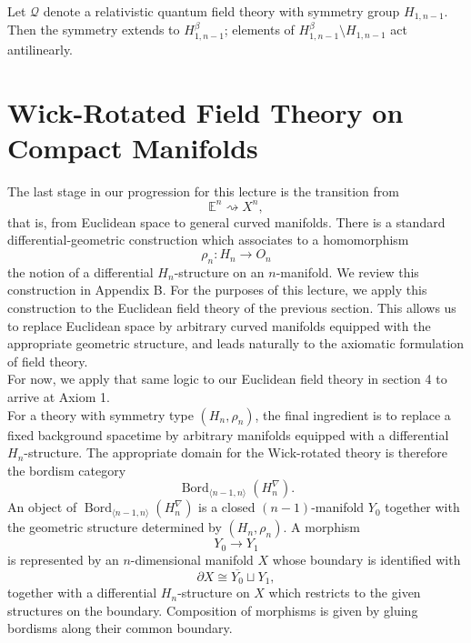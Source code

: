 \documentclass[a4paper,11pt]{article}
\begin{document}
\begin{theorem}
    Let $\mathcal{Q}$ denote a relativistic quantum field theory with symmetry group
    $H_{1,n-1}$. Then the symmetry extends to $H^{\beta}_{1,n-1}$; elements of
    $H^{\beta}_{1,n-1}\setminus H_{1,n-1}$ act antilinearly.
\end{theorem}



\section{Wick-Rotated Field Theory on Compact Manifolds}

The last stage in our progression for this lecture is the transition from
\[
\mathbb{E}^n \rightsquigarrow X^n,
\]
that is, from Euclidean space to general curved manifolds. There is a standard differential-geometric construction which associates to a homomorphism
\[
\rho_n:H_n\longrightarrow O_n
\]
the notion of a differential $H_n$-structure on an $n$-manifold. We review this construction in Appendix B. For the purposes of this lecture, we apply this construction to the Euclidean field theory of the previous section. This allows us to
replace Euclidean space by arbitrary curved manifolds equipped with the appropriate geometric structure, and leads naturally to the axiomatic formulation of field theory.\\


For now, we apply that same logic to our Euclidean field theory in section 4 to arrive at Axiom 1.\\

For a theory with symmetry type $(H_n,\rho_n)$, the final ingredient is to replace a fixed background spacetime by arbitrary manifolds equipped with a differential $H_n$-structure. The appropriate domain for the
Wick-rotated theory is therefore the bordism category
\[
\operatorname{Bord}_{\langle n-1,n\rangle}(H_n^\nabla).
\]
An object of $\operatorname{Bord}_{\langle n-1,n \rangle}(H_n^\nabla)$ is a closed $(n-1)$-manifold $Y_0$ together with the geometric structure determined by
$(H_n,\rho_n)$. A morphism
\[
Y_0 \longrightarrow Y_1
\]
is represented by an $n$-dimensional manifold $X$ whose boundary is
identified with
\[
\partial X \cong \overline{Y_0} \sqcup Y_1,
\]
together with a differential $H_n$-structure on $X$ which restricts to the given structures on the boundary. Composition of morphisms is given by
gluing bordisms along their common boundary.\\
\end{document}
